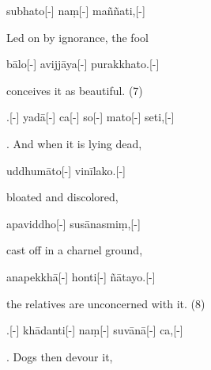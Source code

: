 \begin{samepage}
\begingl[glneveryline={\PaliGlossA,\PaliGlossB}]
subhato[-] naṃ[-] maññati,[-]
\endgl
\nopagebreak
\linespread{0.5}
\begin{spacin}{0.2}
{\PaliGlossFT Led on by ignorance, the fool}
\end{spacin}
\vskip 12pt
\end{samepage}
\begin{samepage}
\begingl[glneveryline={\PaliGlossA,\PaliGlossB}]
bālo[-] avijjāya[-] purakkhato.[-]
\endgl
\nopagebreak
\linespread{0.5}
\begin{spacin}{0.2}
{\PaliGlossFT conceives it as beautiful. (7)}
\end{spacin}
\vskip 12pt
\end{samepage}
\vskip 0.2in
\begin{samepage}
.[-] yadā[-] ca[-] so[-] mato[-] seti,[-]
\endgl
\nopagebreak
\linespread{0.5}
\begin{spacin}{0.2}
{. And when it is lying dead,}
\end{spacin}
\vskip 12pt
\end{samepage}
\begin{samepage}
\begingl[glneveryline={\PaliGlossA,\PaliGlossB}]
uddhumāto[-] vinīlako.[-]
\endgl
\nopagebreak
\linespread{0.5}
\begin{spacin}{0.2}
{\PaliGlossFT bloated and discolored,}
\end{spacin}
\vskip 12pt
\end{samepage}
\begin{samepage}
\begingl[glneveryline={\PaliGlossA,\PaliGlossB}]
apaviddho[-] susānasmiṃ,[-]
\endgl
\nopagebreak
\linespread{0.5}
\begin{spacin}{0.2}
{\PaliGlossFT cast off in a charnel ground,}
\end{spacin}
\vskip 12pt
\end{samepage}
\begin{samepage}
\begingl[glneveryline={\PaliGlossA,\PaliGlossB}]
anapekkhā[-] honti[-] ñātayo.[-]
\endgl
\nopagebreak
\linespread{0.5}
\begin{spacin}{0.2}
{\PaliGlossFT the relatives are unconcerned with it. (8)}
\end{spacin}
\vskip 12pt
\end{samepage}
\vskip 0.2in
\begin{samepage}
.[-] khādanti[-] naṃ[-] suvānā[-] ca,[-]
\endgl
\nopagebreak
\linespread{0.5}
\begin{spacin}{0.2}
{. Dogs then devour it,}
\end{spacin}
\vskip 12pt
\end{samepage}
